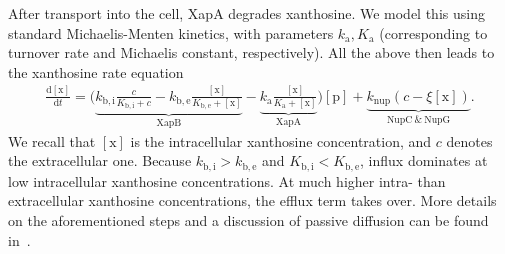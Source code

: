 \documentclass[10pt,letterpaper]{article}
\newcommand{\n}[1]{\mathrm{#1}}
\newcommand{\dd}[2]{\frac{\mathrm{d} #1}{\mathrm{d} #2}}
\begin{document}
After transport into the cell, XapA degrades xanthosine. We model this using
standard Michaelis-Menten kinetics, with parameters $k_{\n{a}}, K_{\n{a}}$
(corresponding to turnover rate and Michaelis constant, respectively). All
the above then leads to the xanthosine rate equation
\begin{eqnarray}
\dd{\n{[x]}}{t} = \biggl(\underbrace{k_{\n{b,i}} \frac{c}{K_{\n{b,i}} + c} - k_{\n{b,e}} \frac{\n{[x]}}{K_{\n{b,e}} + \n{[x]}}}_{\n{XapB}} - \underbrace{k_{\n{a}} \frac{\n{[x]}}{K_{\n{a}} + \n{[x]}}}_{\n{XapA}}\biggr) \n{[p]} + \underbrace{k_{\n{nup}} \left(c- \xi \n{[x]}\right)}_{\n{NupC\ \& \ NupG}}.
\end{eqnarray}
We recall that $\n{[x]}$ is the intracellular xanthosine concentration, and
$c$ denotes the extracellular one. Because $k_{\n{b,i}} > k_{\n{b,e}}$ and
$K_{\n{b,i}} < K_{\n{b,e}}$, influx dominates at low intracellular
xanthosine concentrations. At much higher intra- than extracellular
xanthosine concentrations, the efflux term takes over. More details on the
aforementioned steps and a discussion of passive diffusion can be found
in~.
\end{document}
